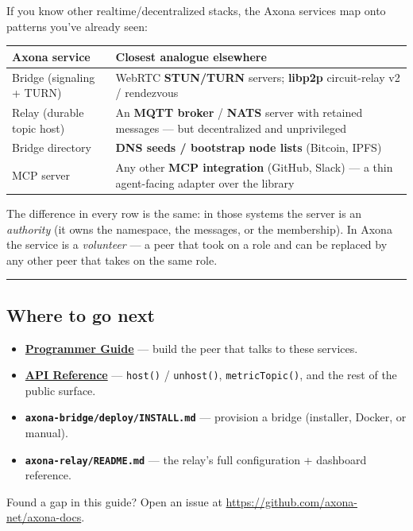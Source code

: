 \documentclass[
  nobib]{tufte-handout}
\newcounter{none} %
\providecommand{\tightlist}{%
  \setlength{\itemsep}{0pt}\setlength{\parskip}{0pt}}
\begin{document}
If you know other realtime/decentralized stacks, the Axona services map
onto patterns you've already seen:

{\def\LTcaptype{none} %
\begin{longtable}[]{@{}
  >{\raggedright\arraybackslash}p{}
  >{\raggedright\arraybackslash}p{}@{}}
\toprule\noalign{}
\begin{minipage}[b]{\linewidth}\raggedright
Axona service
\end{minipage} & \begin{minipage}[b]{\linewidth}\raggedright
Closest analogue elsewhere
\end{minipage} \\
\midrule\noalign{}
\endhead
\bottomrule\noalign{}
\endlastfoot
Bridge (signaling + TURN) & WebRTC \textbf{STUN/TURN} servers;
\textbf{libp2p} circuit-relay v2 / rendezvous \\
Relay (durable topic host) & An \textbf{MQTT broker} / \textbf{NATS}
server with retained messages --- but decentralized and unprivileged \\
Bridge directory & \textbf{DNS seeds / bootstrap node lists} (Bitcoin,
IPFS) \\
MCP server & Any other \textbf{MCP integration} (GitHub, Slack) --- a
thin agent-facing adapter over the library \\
\end{longtable}
}

The difference in every row is the same: in those systems the server is
an \emph{authority} (it owns the namespace, the messages, or the
membership). In Axona the service is a \emph{volunteer} --- a peer that
took on a role and can be replaced by any other peer that takes on the
same role.

\begin{center}\rule{0.5\linewidth}{0.5pt}\end{center}

\subsection{Where to go next}\label{where-to-go-next}

\begin{itemize}
\tightlist
\item
  \textbf{\href{Axona-Programmer-Guide-v4.22.0.md}{Programmer Guide}}
  --- build the peer that talks to these services.
\item
  \textbf{\href{Axona-API-Reference-v4.22.0.md}{API Reference}} ---
  \texttt{host()} / \texttt{unhost()}, \texttt{metricTopic()}, and the
  rest of the public surface.
\item
  \textbf{\texttt{axona-bridge/deploy/INSTALL.md}} --- provision a
  bridge (installer, Docker, or manual).
\item
  \textbf{\texttt{axona-relay/README.md}} --- the relay's full
  configuration + dashboard reference.
\end{itemize}

Found a gap in this guide? Open an issue at
\url{https://github.com/axona-net/axona-docs}.
\end{document}
